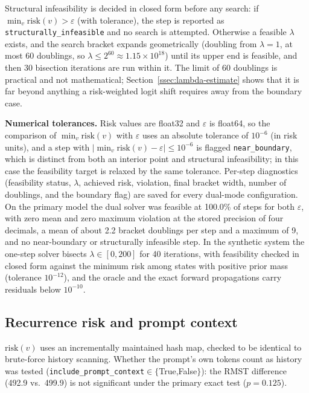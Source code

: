 \documentclass[11pt]{article}
\newcommand{\risk}{\mathrm{risk}}
\begin{document}
Structural infeasibility is decided in closed form before any search: if $\min_v\risk(v)>\varepsilon$ (with tolerance), the step is reported as \texttt{structurally\_\allowbreak{}infeasible} and no search is attempted. Otherwise a feasible $\lambda$ exists, and the search bracket expands geometrically (doubling from $\lambda{=}1$, at most 60 doublings, so $\lambda\le2^{60}\approx1.15\times10^{18}$) until its upper end is feasible, and then 30 bisection iterations are run within it. The limit of 60 doublings is practical and not mathematical; Section~\ref{ssec:lambda-estimate} shows that it is far beyond anything a risk-weighted logit shift requires away from the boundary case.

\textbf{Numerical tolerances.} Risk values are float32 and $\varepsilon$ is float64, so the comparison of $\min_v\risk(v)$ with $\varepsilon$ uses an absolute tolerance of $10^{-6}$ (in risk units), and a step with $|\min_v\risk(v)-\varepsilon|\le10^{-6}$ is flagged \texttt{near\_\allowbreak{}boundary}, which is distinct from both an interior point and structural infeasibility; in this case the feasibility target is relaxed by the same tolerance. Per-step diagnostics (feasibility status, $\lambda$, achieved risk, violation, final bracket width, number of doublings, and the boundary flag) are saved for every dual-mode configuration. On the primary model the dual solver was feasible at 100.0\% of steps for both $\varepsilon$, with zero mean and zero maximum violation at the stored precision of four decimals, a mean of about 2.2 bracket doublings per step and a maximum of 9, and no near-boundary or structurally infeasible step. In the synthetic system the one-step solver bisects $\lambda\in[0,200]$ for 40 iterations, with feasibility checked in closed form against the minimum risk among states with positive prior mass (tolerance $10^{-12}$), and the oracle and the exact forward propagations carry residuals below $10^{-10}$.

\subsection{Recurrence risk and prompt context}
$\risk(v)$ uses an incrementally maintained hash map, checked to be identical to brute-force history scanning. Whether the prompt's own tokens count as history was tested (\texttt{include\_\allowbreak{}prompt\_\allowbreak{}context}$\in\{$True,False$\}$): the RMST difference (492.9 vs.\ 499.9) is not significant under the primary exact test ($p{=}0.125$).
\end{document}
